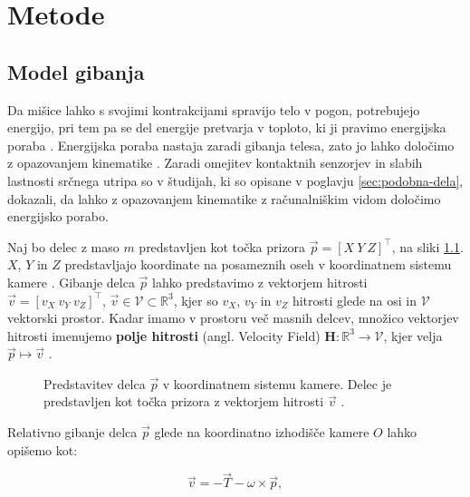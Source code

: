\chapter{Metode}\label{sec:metode}
\section{Model gibanja}\label{sec:model-gibanja}
Da mišice lahko s svojimi kontrakcijami spravijo telo v pogon, potrebujejo energijo, pri tem pa se del energije pretvarja v toploto, ki ji pravimo energijska poraba \cite{scott2005misconceptions}. Energijska poraba nastaja zaradi gibanja telesa, zato jo lahko določimo z opazovanjem kinematike \cite{levine2005measurement}. Zaradi omejitev kontaktnih senzorjev in slabih lastnosti srčnega utripa so v študijah, ki so opisane v poglavju \ref{sec:podobna-dela}, dokazali, da lahko z opazovanjem kinematike z računalniškim vidom določimo energijsko porabo. 

Naj bo delec z maso $m$ predstavljen kot točka prizora $\vec{p} = [X~Y~Z]^\top$, na sliki \ref{fig:model-gibanja}. $X$, $Y$ in $Z$ predstavljajo koordinate na posameznih oseh v koordinatnem sistemu kamere \cite{trucco1998introductory}. Gibanje delca $\vec{p}$ lahko predstavimo z vektorjem hitrosti $\vec{v} = [v_X~v_Y~v_Z]^\top$, $\vec{v} \in \mathcal{V} \subset \mathbb{R}^3$, kjer so $v_X$, $v_Y$ in $v_Z$ hitrosti glede na osi in $\mathcal{V}$ vektorski prostor. Kadar imamo v prostoru več masnih delcev, množico vektorjev hitrosti imenujemo \textbf{polje hitrosti} (angl. Velocity Field) $\mathbf{H}: \mathbb{R}^3 \to \mathcal{V}$, kjer velja $\vec{p} \mapsto \vec{v}$ \cite{trucco1998introductory}.


\begin{figure}
\centering

\caption[Predstavitev delca $\vec{p}$ v koordinatnem sistemu kamere]{Predstavitev delca $\vec{p}$ v koordinatnem sistemu kamere. Delec je predstavljen kot točka prizora z vektorjem hitrosti $\vec{v}$ \cite{trucco1998introductory}.}
\label{fig:model-gibanja}
\end{figure}




Relativno gibanje delca $\vec{p}$ glede na koordinatno izhodišče kamere $O$ lahko opišemo kot:

\begin{equation}
	\vec{v} = -\vec{T}-\omega\times\vec{p},
\end{equation}

